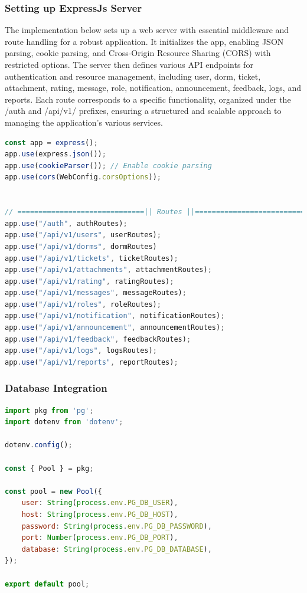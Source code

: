 	
	\subsubsection{Setting up ExpressJs Server}
	The implementation below sets up a web server with essential middleware and route handling for a robust application. It initializes the app, enabling JSON parsing, cookie parsing, and Cross-Origin Resource Sharing (CORS) with restricted options. The server then defines various API endpoints for authentication and resource management, including user, dorm, ticket, attachment, rating, message, role, notification, announcement, feedback, logs, and reports. Each route corresponds to a specific functionality, organized under the /auth and /api/v1/ prefixes, ensuring a structured and scalable approach to managing the application’s various services.

\begin{lstlisting}[language=Javascript, breaklines=true, caption=ExpressJS Server Setup]
const app = express();
app.use(express.json());
app.use(cookieParser()); // Enable cookie parsing
app.use(cors(WebConfig.corsOptions));


// ==============================|| Routes ||============================== //
app.use("/auth", authRoutes);                     
app.use("/api/v1/users", userRoutes);                  
app.use("/api/v1/dorms", dormRoutes)
app.use("/api/v1/tickets", ticketRoutes);        
app.use("/api/v1/attachments", attachmentRoutes); 
app.use("/api/v1/rating", ratingRoutes);          
app.use("/api/v1/messages", messageRoutes);
app.use("/api/v1/roles", roleRoutes);       
app.use("/api/v1/notification", notificationRoutes); 
app.use("/api/v1/announcement", announcementRoutes);        
app.use("/api/v1/feedback", feedbackRoutes);       
app.use("/api/v1/logs", logsRoutes);     
app.use("/api/v1/reports", reportRoutes);
\end{lstlisting}	

	\subsubsection{Database Integration}
	
\begin{lstlisting}[language=Javascript, breaklines=true, caption=Server connects to PostgreSQL Database]
import pkg from 'pg';
import dotenv from 'dotenv';

dotenv.config();

const { Pool } = pkg;

const pool = new Pool({
	user: String(process.env.PG_DB_USER),
	host: String(process.env.PG_DB_HOST),
	password: String(process.env.PG_DB_PASSWORD),
	port: Number(process.env.PG_DB_PORT),
	database: String(process.env.PG_DB_DATABASE),
});

export default pool;  
\end{lstlisting}	


